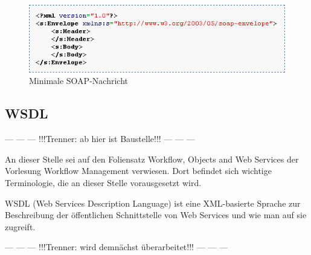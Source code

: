 \documentclass[runningheads]{llncs}
\newcommand{\germanquote}[1]{\glqq{}#1\grqq{}}
\begin{document}
    \begin{figure}
      \centering
      \includegraphics[width=\textwidth]{../images/min_soap.png}
      \caption{Minimale SOAP-Nachricht}
      \label{fig:min_soap}
    \end{figure}


  \subsection{WSDL}
  \label{wsdl}
  \nocite{wk_wsdl}
   \begin{center}--- --- --- !!!Trenner: ab hier ist Baustelle!!! --- --- ---\end{center}

    An dieser Stelle sei auf den Foliensatz \germanquote{Workflow, Objects and Web Ser\-vi\-ces}\cite{wfm_ch7} der Vorlesung \germanquote{Workflow Management}\cite{wfm_site} verwiesen. Dort befindet sich wichtige Terminologie, die an dieser Stelle vorausgesetzt wird.

    WSDL (Web Services Description Language) ist eine XML-basierte Sprache zur Beschreibung der öffentlichen Schnittstelle von Web Services und wie man auf sie zugreift.

   \begin{center}--- --- --- !!!Trenner: wird demnächst überarbeitet!!! --- --- ---\end{center}
\end{document}
